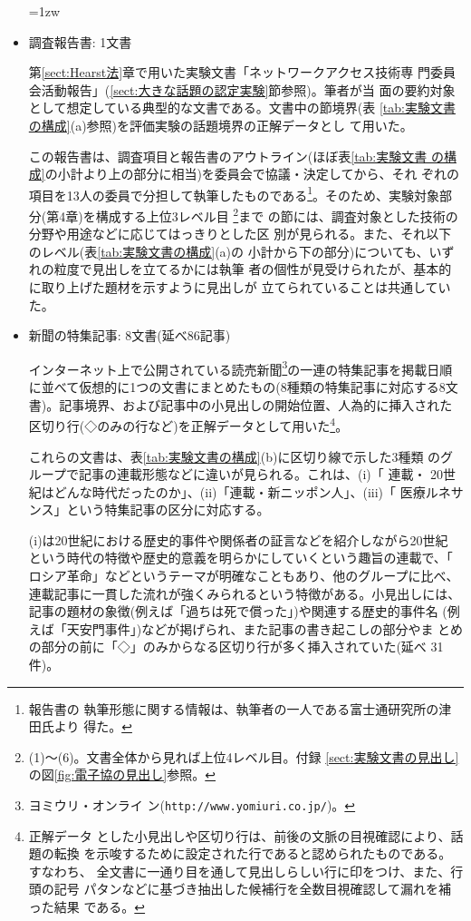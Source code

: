 \begin{itemize}\parindent=1zw
\item 調査報告書: 1文書
  
  第\ref{sect:Hearst法}章で用いた実験文書「ネットワークアクセス技術専
  門委員会活動報告」(\ref{sect:大きな話題の認定実験}節参照)。筆者が当
  面の要約対象として想定している典型的な文書である。文書中の節境界(表
  \ref{tab:実験文書の構成}(a)参照)を評価実験の話題境界の正解データとし
  て用いた。
  
  この報告書は、調査項目と報告書のアウトライン(ほぼ表\ref{tab:実験文書
    の構成}の小計より上の部分に相当)を委員会で協議・決定してから、それ
  ぞれの項目を13人の委員で分担して執筆したものである\footnote{報告書の
    執筆形態に関する情報は、執筆者の一人である富士通研究所の津田氏より
    得た。}。そのため、実験対象部分(第4章)を構成する上位3レベル目
  \footnote{(1)〜(6)。文書全体から見れば上位4レベル目。付録
    \ref{sect:実験文書の見出し}の図\ref{fig:電子協の見出し}参照。}まで
  の節には、調査対象とした技術の分野や用途などに応じてはっきりとした区
  別が見られる。また、それ以下のレベル(表\ref{tab:実験文書の構成}(a)の
  小計から下の部分)についても、いずれの粒度で見出しを立てるかには執筆
  者の個性が見受けられたが、基本的に取り上げた題材を示すように見出しが
  立てられていることは共通していた。
  

  
\item 新聞の特集記事: 8文書(延べ86記事)
  
  インターネット上で公開されている読売新聞\footnote{ヨミウリ・オンライ
    ン(\verb$http://www.yomiuri.co.jp/$)。}の一連の特集記事を掲載日順
  に並べて仮想的に1つの文書にまとめたもの(8種類の特集記事に対応する8文
  書)。記事境界、および記事中の小見出しの開始位置、人為的に挿入された
  区切り行(◇のみの行など)を正解データとして用いた\footnote{正解データ
    とした小見出しや区切り行は、前後の文脈の目視確認により、話題の転換
    を示唆するために設定された行であると認められたものである。すなわち、
    全文書に一通り目を通して見出しらしい行に印をつけ、また、行頭の記号
    パタンなどに基づき抽出した候補行を全数目視確認して漏れを補った結果
    である。}。

  
  これらの文書は、表\ref{tab:実験文書の構成}(b)に区切り線で示した3種類
  のグループで記事の連載形態などに違いが見られる。これは、(i)「 連載・
  20世紀はどんな時代だったのか」、(ii)「連載・新ニッポン人」、(iii)「
  医療ルネサンス」という特集記事の区分に対応する。

  (i)は20世紀における歴史的事件や関係者の証言などを紹介しながら20世紀
  という時代の特徴や歴史的意義を明らかにしていくという趣旨の連載で、「
  ロシア革命」などというテーマが明確なこともあり、他のグループに比べ、
  連載記事に一貫した流れが強くみられるという特徴がある。小見出しには、
  記事の題材の象徴(例えば「過ちは死で償った」)や関連する歴史的事件名
  (例えば「天安門事件」)などが掲げられ、また記事の書き起こしの部分やま
  とめの部分の前に「◇」のみからなる区切り行が多く挿入されていた(延べ
  31件)。


\end{itemize}
